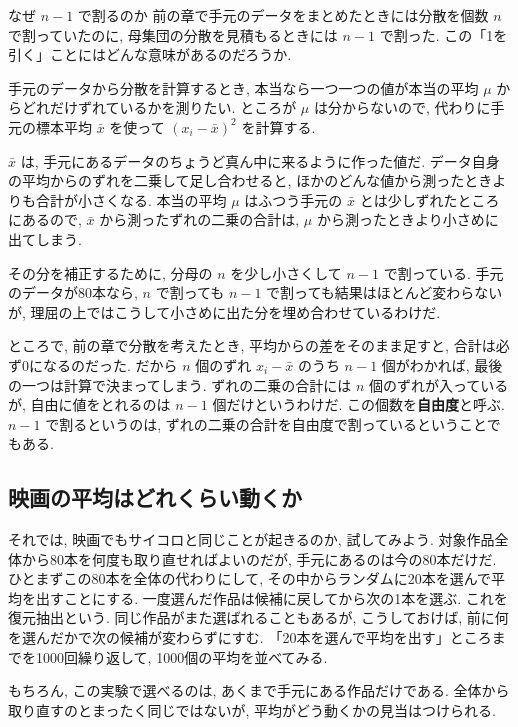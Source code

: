     \begin{mybox}{なぜ $n-1$ で割るのか}
      前の章で手元のデータをまとめたときには分散を個数 $n$ で割っていたのに, 母集団の分散を見積もるときには $n-1$ で割った.
      この「1を引く」ことにはどんな意味があるのだろうか.

      手元のデータから分散を計算するとき, 本当なら一つ一つの値が本当の平均 $\mu$ からどれだけずれているかを測りたい.
      ところが $\mu$ は分からないので, 代わりに手元の標本平均 $\bar{x}$ を使って $(x_i - \bar{x})^2$ を計算する.

      $\bar{x}$ は, 手元にあるデータのちょうど真ん中に来るように作った値だ.
      データ自身の平均からのずれを二乗して足し合わせると, ほかのどんな値から測ったときよりも合計が小さくなる.
      本当の平均 $\mu$ はふつう手元の $\bar{x}$ とは少しずれたところにあるので, $\bar{x}$ から測ったずれの二乗の合計は, $\mu$ から測ったときより小さめに出てしまう.

      その分を補正するために, 分母の $n$ を少し小さくして $n-1$ で割っている.
      手元のデータが80本なら, $n$ で割っても $n-1$ で割っても結果はほとんど変わらないが, 理屈の上ではこうして小さめに出た分を埋め合わせているわけだ.

      ところで, 前の章で分散を考えたとき, 平均からの差をそのまま足すと, 合計は必ず0になるのだった.
      だから $n$ 個のずれ $x_i - \bar{x}$ のうち $n-1$ 個がわかれば, 最後の一つは計算で決まってしまう.
      ずれの二乗の合計には $n$ 個のずれが入っているが, 自由に値をとれるのは $n-1$ 個だけというわけだ.
      この個数を\textbf{自由度}と呼ぶ. $n-1$ で割るというのは, ずれの二乗の合計を自由度で割っているということでもある.
    \end{mybox}

  \subsection{映画の平均はどれくらい動くか}

    それでは, 映画でもサイコロと同じことが起きるのか, 試してみよう.
    対象作品全体から80本を何度も取り直せればよいのだが, 手元にあるのは今の80本だけだ.
    ひとまずこの80本を全体の代わりにして, その中からランダムに20本を選んで平均を出すことにする.
    一度選んだ作品は候補に戻してから次の1本を選ぶ. これを復元抽出という.
    同じ作品がまた選ばれることもあるが, こうしておけば, 前に何を選んだかで次の候補が変わらずにすむ.
    「20本を選んで平均を出す」ところまでを1000回繰り返して, 1000個の平均を並べてみる.

    もちろん, この実験で選べるのは, あくまで手元にある作品だけである.
    全体から取り直すのとまったく同じではないが, 平均がどう動くかの見当はつけられる.

